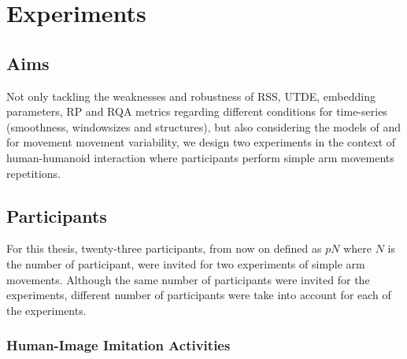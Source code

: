 			\chapter{Experiments} \label{chapter4}

%

\graphicspath{{figs/chapter4/PDF/}}




\section{Aims}
Not only tackling the weaknesses and robustness of RSS, UTDE, embedding 
parameters, RP and RQA metrics regarding different conditions for 
time-series (smoothness, windowsizes and structures), but also 
considering the models of \cite{stergiou2006} and 
\citep{vaillancourt2002, vaillancourt2003} for movement movement variability, 
we design two experiments in the context of human-humanoid interaction
where participants perform simple arm movements repetitions.


\section{Participants}
For this thesis, twenty-three participants, from now on defined as $pN$ 
where $N$ is the number of participant, were invited for two experiments of 
simple arm movements. Although the same number of participants were invited
for the experiments, different number of participants were take into account 
for each of the experiments.


\subsection{Human-Image Imitation Activities}






